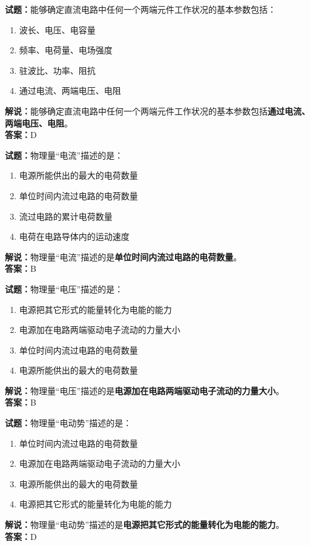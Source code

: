 \documentclass{ctexbook}
\begin{document}
\bigskip


\noindent\textbf{试题：}能够确定直流电路中任何一个两端元件工作状况的基本参数包括：
\begin{enumerate}[leftmargin=3em]
\item 波长、电压、电容量
\item 频率、电荷量、电场强度
\item 驻波比、功率、阻抗
\item 通过电流、两端电压、电阻
\end{enumerate}
\noindent\textbf{解说：}能够确定直流电路中任何一个两端元件工作状况的基本参数包括\textbf{通过电流、两端电压、电阻}。\\\noindent\textbf{答案：}D



\bigskip


\noindent\textbf{试题：}物理量“电流”描述的是：
\begin{enumerate}[leftmargin=3em]
\item 电源所能供出的最大的电荷数量
\item 单位时间内流过电路的电荷数量
\item 流过电路的累计电荷数量
\item 电荷在电路导体内的运动速度
\end{enumerate}
\noindent\textbf{解说：}物理量“电流”描述的是\textbf{单位时间内流过电路的电荷数量}。\\\noindent\textbf{答案：}B



\bigskip


\noindent\textbf{试题：}物理量“电压”描述的是：
\begin{enumerate}[leftmargin=3em]
\item 电源把其它形式的能量转化为电能的能力
\item 电源加在电路两端驱动电子流动的力量大小
\item 单位时间内流过电路的电荷数量
\item 电源所能供出的最大的电荷数量
\end{enumerate}
\noindent\textbf{解说：}物理量“电压”描述的是\textbf{电源加在电路两端驱动电子流动的力量大小}。\\\noindent\textbf{答案：}B


\bigskip


\noindent\textbf{试题：}物理量“电动势”描述的是：
\begin{enumerate}[leftmargin=3em]
\item 单位时间内流过电路的电荷数量
\item 电源加在电路两端驱动电子流动的力量大小
\item 电源所能供出的最大的电荷数量
\item 电源把其它形式的能量转化为电能的能力
\end{enumerate}
\noindent\textbf{解说：}物理量“电动势”描述的是\textbf{电源把其它形式的能量转化为电能的能力}。\\\noindent\textbf{答案：}D
\end{document}
